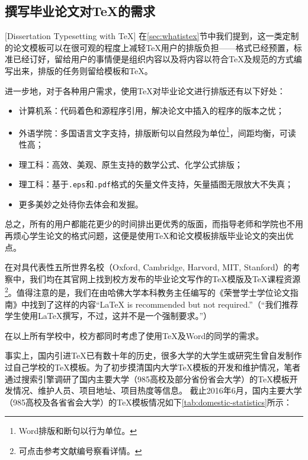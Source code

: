 \subsection{撰写毕业论文对\TeX 的需求}[Dissertation Typesetting with \TeX]\label{sec:texBene}
在\ref{sec:whatistex}节中我们提到，\cquthesis 这一类定制的论文模板可以在很可观的程度上减轻\TeX 用户的排版负担——格式已经预置，标准已经订好，留给用户的事情便是组织内容以及将内容以符合\TeX 及\cquthesis 规范的方式编写出来，排版的任务则留给模板和\TeX 。

进一步地，对于各种用户需求，使用\TeX 对毕业论文进行排版还有以下好处：
\begin{itemize}
	\item 计算机系：代码着色和源程序引用，解决论文中插入的程序的版本之忧；
	\item 外语学院：多国语言文字支持，排版断句以自然段为单位\footnote{Word排版和断句以行为单位。}，间距均衡，可读性高；
	\item 理工科：高效、美观、原生支持的数学公式、化学公式排版；
	\item 理工科：基于\texttt{.eps}和\texttt{.pdf}格式的矢量文件支持，矢量插图无限放大不失真；
	\item 更多美妙之处待你去体会和发掘。
\end{itemize}

总之，所有的用户都能花更少的时间排出更优秀的版面，而指导老师和学院也不用再烦心学生论文的格式问题，这便是使用\TeX 和论文模板排版毕业论文的突出优点。

在对具代表性五所世界名校（Oxford\cite{o1,o2}, Cambridge\cite{c1,c2}, Harvord\cite{h1,h2}, MIT\cite{m1}, Stanford\cite{s1,s2}）的考察中，我们均在其官网上找到校方发布的毕业论文写作的\TeX 模版及\TeX 课程资源\footnote{可点击参考文献编号察看详情。}。值得注意的是，我们在由哈佛大学本科教务主任编写的《荣誉学士学位论文指南》\cite{h1}中找到了这样的内容“\LaTeX{} is recommended but not required.”（“我们推荐学生使用\LaTeX 撰写，不过，这并不是一个强制要求。”）

在以上所有学校中，校方都同时考虑了使用\TeX 及Word的同学的需求。

事实上，国内引进\TeX 已有数十年的历史，很多大学的大学生或研究生曾自发制作过自己学校的\TeX 模板。为了初步摸清国内大学\TeX 模板的开发和维护情况，笔者通过搜索引擎调研了国内主要大学（985高校及部分省份省会大学）的\TeX 模板开发情况、维护人员、项目地址、项目热度等信息。
截止2016年6月，国内主要大学（985高校及各省省会大学）的\TeX 模板情况如下\autoref{tab:domestic-statistics}所示：

